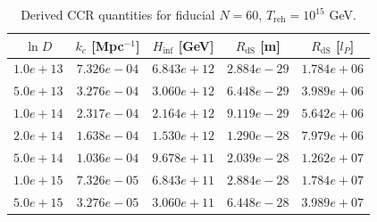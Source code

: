 \begin{table}[htbp]
\centering
\caption{Derived CCR quantities for fiducial $N=60$, $T_{\mathrm{reh}} = 10^{15}$ GeV.}
\label{tab:derived_quantities}
\begin{tabular}{ccccc}
\hline\hline
$\ln D$ & $k_c$ [Mpc$^{-1}$] & $H_{\mathrm{inf}}$ [GeV] & $R_{\mathrm{dS}}$ [m] & $R_{\mathrm{dS}}$ [$l_P$] \\
\hline
$1.0e+13$ & $7.326e-04$ & $6.843e+12$ & $2.884e-29$ & $1.784e+06$ \\
$5.0e+13$ & $3.276e-04$ & $3.060e+12$ & $6.448e-29$ & $3.989e+06$ \\
$1.0e+14$ & $2.317e-04$ & $2.164e+12$ & $9.119e-29$ & $5.642e+06$ \\
$2.0e+14$ & $1.638e-04$ & $1.530e+12$ & $1.290e-28$ & $7.979e+06$ \\
$5.0e+14$ & $1.036e-04$ & $9.678e+11$ & $2.039e-28$ & $1.262e+07$ \\
$1.0e+15$ & $7.326e-05$ & $6.843e+11$ & $2.884e-28$ & $1.784e+07$ \\
$5.0e+15$ & $3.276e-05$ & $3.060e+11$ & $6.448e-28$ & $3.989e+07$ \\
\hline\hline
\end{tabular}
\end{table}